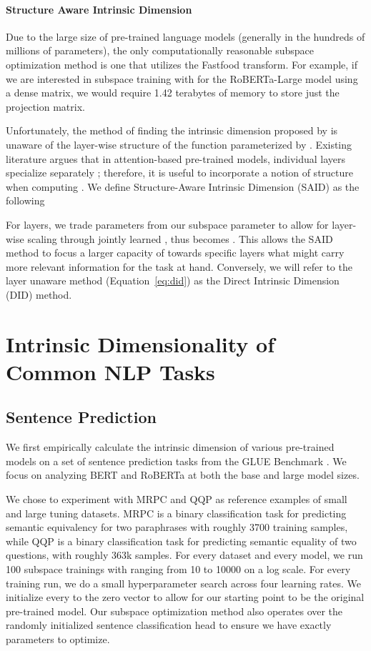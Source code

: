 \documentclass{article} \usepackage{iclr2020_conference,times}
\begin{document}
\paragraph{Structure Aware Intrinsic Dimension}
Due to the large size of pre-trained language models (generally in the hundreds of millions of parameters), the only computationally reasonable subspace optimization method is one that utilizes the Fastfood transform. For example, if we are interested in subspace training with  for the RoBERTa-Large model using a dense matrix, we would require 1.42 terabytes of memory to store just the projection matrix.

Unfortunately, the method of finding the intrinsic dimension proposed by \cite{intrinsic_dimension} is unaware of the layer-wise structure of the function parameterized by . Existing literature argues that in attention-based pre-trained models, individual layers specialize separately \citep{what_does_bert_look_at}; therefore, it is useful to incorporate a notion of structure when computing . 
We define Structure-Aware Intrinsic Dimension (SAID) as the following

For  layers, we trade  parameters from our subspace parameter  to allow for layer-wise scaling through jointly learned , thus  becomes . This allows the SAID method to focus a larger capacity of  towards specific layers what might carry more relevant information for the task at hand. Conversely, we will refer to the layer unaware method (Equation~\ref{eq:did}) as the Direct Intrinsic Dimension (DID) method.
\section{Intrinsic Dimensionality of Common NLP Tasks}
\label{sec:mes}

\subsection{Sentence Prediction}
We first empirically calculate the intrinsic dimension of various pre-trained models on a set of sentence prediction tasks from the GLUE Benchmark \citep{GLUE}. We focus on analyzing BERT \citep{BERT} and RoBERTa \citep{ROBERTA} at both the base and large model sizes.

We chose to experiment with MRPC \citep{mrpc} and QQP \citep{qqp} as reference examples of small and large tuning datasets. MRPC is a binary classification task for predicting semantic equivalency for two paraphrases with roughly 3700 training samples, while QQP is a binary classification task for predicting semantic equality of two questions, with roughly 363k samples. For every dataset and every model, we run 100 subspace trainings with  ranging from 10 to 10000 on a log scale. For every training run, we do a small hyperparameter search across four learning rates. We initialize every  to the zero vector to allow for our starting point to be the original pre-trained model. Our subspace optimization method also operates over the randomly initialized sentence classification head to ensure we have exactly  parameters to optimize.
\end{document}
